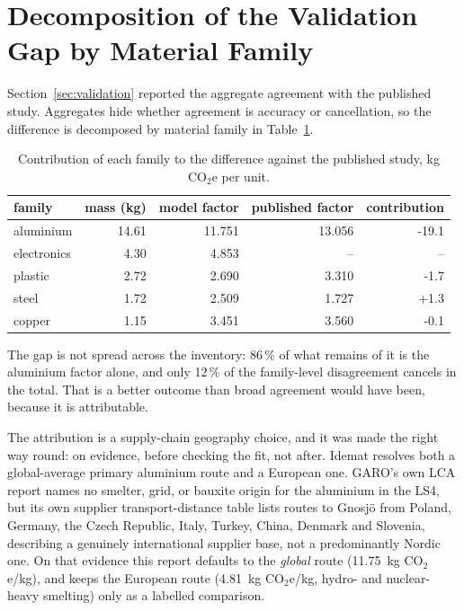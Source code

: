 \documentclass[11pt,a4paper]{article}
\begin{document}
\FloatBarrier
\section{Decomposition of the Validation Gap by Material Family}

Section~\ref{sec:validation} reported the aggregate agreement with the
published study. Aggregates hide whether agreement is accuracy or cancellation,
so the difference is decomposed by material family in
Table~\ref{tab:vdecomp}.

\begin{table}[h]
\centering\small
\caption{Contribution of each family to the difference against the published
study, \si{\kilo\gram} CO$_2$e per unit.}
\label{tab:vdecomp}
\begin{tabular}{lrrrr}
\toprule
family & mass (kg) & model factor & published factor & contribution \\
\midrule
aluminium & 14.61 & 11.751 & 13.056 & -19.1 \\
electronics & 4.30 & 4.853 & -- & -- \\
plastic & 2.72 & 2.690 & 3.310 & -1.7 \\
steel & 1.72 & 2.509 & 1.727 & +1.3 \\
copper & 1.15 & 3.451 & 3.560 & -0.1 \\
\bottomrule
\end{tabular}
\end{table}

The gap is not spread across the inventory: 86\,\% of what remains of
it is the aluminium factor alone, and only 12\,\% of the
family-level disagreement cancels in the total. That is a better outcome than
broad agreement would have been, because it is attributable.

The attribution is a supply-chain geography choice, and it was made the right
way round: on evidence, before checking the fit, not after. Idemat resolves
both a global-average primary aluminium route and a European one. GARO's own
LCA report names no smelter, grid, or bauxite origin for the aluminium in the
LS4, but its own supplier transport-distance table lists routes to Gnosjö
from Poland, Germany, the Czech Republic, Italy, Turkey, China, Denmark and
Slovenia, describing a genuinely international supplier base, not a
predominantly Nordic one. On that evidence this report defaults to the
\emph{global} route (\SI{11.75}{\kilo\gram} CO$_2$e/kg), and keeps
the European route (\SI{4.81}{\kilo\gram} CO$_2$e/kg, hydro- and
nuclear-heavy smelting) only as a labelled comparison.
\end{document}
